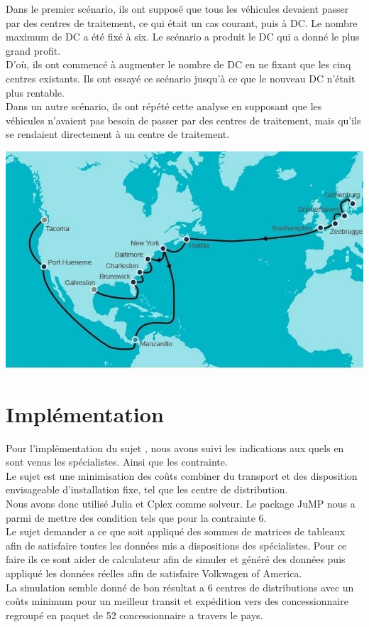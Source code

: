 \documentclass{ceri}
\begin{document}
Dans le premier scénario, ils ont supposé que tous les véhicules devaient passer par des centres de traitement, ce qui était un cas courant, puis à DC. Le nombre maximum de DC a été fixé à six. Le scénario a produit le DC qui a donné le plus grand profit.\\
D'où, ils ont commencé à augmenter le nombre de DC en ne fixant que les cinq centres existants. Ils ont essayé ce scénario jusqu'à ce que le nouveau DC n'était plus rentable.\\
Dans un autre scénario, ils ont répété cette analyse en supposant que les véhicules n'avaient pas besoin de passer par des centres de traitement, mais qu'ils se rendaient directement à un centre de traitement. 

\bigskip
\bigskip

\includegraphics[width=15cm]{monde.jpg}
 
\clearpage
\bigskip

\section{Implémentation}

Pour l’implémentation du sujet , nous avons suivi les indications aux quels en sont venus les spécialistes. Ainsi que les contrainte.\\


	Le sujet est une minimisation des coûts combiner du transport et des  disposition envisageable d’installation fixe, tel que les centre de distribution.\\
Nous avons donc utilisé Julia et Cplex comme solveur. Le package JuMP nous a parmi de mettre des condition tels que pour la contrainte 6.\\


	Le sujet demander a ce que soit appliqué des sommes de matrices de tableaux afin de satisfaire toutes les données mis a dispositions des spécialistes. Pour ce faire ils ce sont aider de calculateur afin de simuler et généré des données puis appliqué les données réelles afin de satisfaire Volkwagen of America.\\
	La simulation semble donné de bon résultat a 6 centres de distributions avec un coûts minimum pour un meilleur transit et expédition vers des concessionnaire regroupé en paquet de 52 concessionnaire a travers le pays.\\
    
\end{document}
